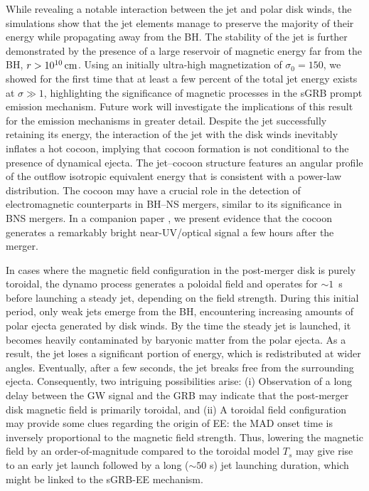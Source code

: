 \documentclass[twocolumn,dvipsnames]{aastex62}
\begin{document}
While revealing a notable interaction between the jet and polar disk winds, the simulations show that the jet elements manage to preserve the majority of their energy while propagating away from the BH. The stability of the jet is further demonstrated by the presence of a large reservoir of magnetic energy far from the BH, $ r > 10^{10}\,{\rm cm}$. Using an initially ultra-high magnetization of $ \sigma_0 = 150 $, we showed for the first time that at least a few percent of the total jet energy exists at $ \sigma \gg 1 $, highlighting the significance of magnetic processes in the sGRB prompt emission mechanism. Future work will investigate the implications of this result for the emission mechanisms in greater detail. Despite the jet successfully retaining its energy, the interaction of the jet with the disk winds inevitably inflates a hot cocoon, implying that cocoon formation is not conditional to the presence of dynamical ejecta. The jet--cocoon structure features an angular profile of the outflow isotropic equivalent energy that is consistent with a power-law distribution. The cocoon may have a crucial role in the detection of electromagnetic counterparts in BH--NS mergers, similar to its significance in BNS mergers. In a companion paper \citet{Gottlieb2023b}, we present evidence that the cocoon generates a remarkably bright near-UV/optical signal a few hours after the merger.

In cases where the magnetic field configuration in the post-merger disk is purely toroidal, the dynamo process generates a poloidal field and operates for $ \sim 1 $~s before launching a steady jet, depending on the field strength. During this initial period, only weak jets emerge from the BH, encountering increasing amounts of polar ejecta generated by disk winds. By the time the steady jet is launched, it becomes heavily contaminated by baryonic matter from the polar ejecta. As a result, the jet loses a significant portion of energy, which is redistributed at wider angles. Eventually, after a few seconds, the jet breaks free from the surrounding ejecta. Consequently, two intriguing possibilities arise: (i) Observation of a long delay between the GW signal and the GRB may indicate that the post-merger disk magnetic field is primarily toroidal, and (ii) A toroidal field configuration may provide some clues regarding the origin of EE: the MAD onset time is inversely proportional to the magnetic field strength. Thus, lowering the magnetic field by an order-of-magnitude compared to the toroidal model $ T_s $ may give rise to an early jet launch followed by a long ($ \sim 50 $ s) jet launching duration, which might be linked to the sGRB-EE mechanism.
\end{document}
